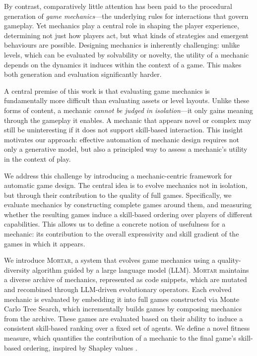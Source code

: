 \documentclass{article} %
\newcommand{\name}{\textsc{Mortar}}
\begin{document}
By contrast, comparatively little attention has been paid to the procedural generation of \emph{game mechanics}---the underlying rules for interactions that govern gameplay. Yet mechanics play a central role in shaping the player experience, determining not just how players act, but what kinds of strategies and emergent behaviours are possible. Designing mechanics is inherently challenging: unlike levels, which can be evaluated by solvability or novelty, the utility of a mechanic depends on the dynamics it induces within the context of a game. This makes both generation and evaluation significantly harder.

A central premise of this work is that evaluating game mechanics is fundamentally more difficult than evaluating assets or level layouts. Unlike these forms of content, a mechanic \emph{cannot be judged in isolation}---it only gains meaning through the gameplay it enables. A mechanic that appears novel or complex may still be uninteresting if it does not support skill-based interaction. This insight motivates our approach: effective automation of mechanic design requires not only a generative model, but also a principled way to assess a mechanic's utility in the context of play.

We address this challenge by introducing a mechanic-centric framework for automatic game design. The central idea is to evolve mechanics not in isolation, but through their contribution to the quality of full games. Specifically, we evaluate mechanics by constructing complete games around them, and measuring whether the resulting games induce a skill-based ordering over players of different capabilities. This allows us to define a concrete notion of usefulness for a mechanic: its contribution to the overall expressivity and skill gradient of the games in which it appears.

We introduce \name{}, a system that evolves game mechanics using a quality-diversity algorithm guided by a large language model (LLM). 
\name{} maintains a diverse archive of mechanics, represented as code snippets, which are mutated and recombined through LLM-driven evolutionary operators.
Each evolved mechanic is evaluated by embedding it into full games constructed via Monte Carlo Tree Search, which incrementally builds games by composing mechanics from the archive. 
These games are evaluated based on their ability to induce a consistent skill-based ranking over a fixed set of agents.
We define a novel fitness measure, which quantifies the contribution of a mechanic to the final game's skill-based ordering, inspired by Shapley values \citep{shapley1953value}.
\end{document}
